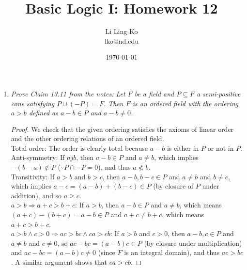 \documentclass{article}
\begin{document}
\title{Basic Logic I: Homework 12}
\author{Li Ling Ko\\ lko@nd.edu}
\date{\today}
\maketitle

\begin{enumerate}[label={\bf Q\arabic*:}]
  \item \it Prove Claim 13.11 from the notes: Let $F$ be a field and
    $P\subseteq F$ a semi-positive cone satisfying $P\cup(-P)=F$. Then $F$
    is an ordered field with the ordering $a>b$ defined as $a-b\in P$ and
    $a-b\neq0$. 

    \begin{proof}
      We check that the given ordering satisfies the axioms of linear
      order and the other ordering relations of an ordered field. \\

      Total order: The order is clearly total because $a-b$ is either in
      $P$ or not in $P$. \\

      Anti-symmetry: If $ajb$, then $a-b\in P$ and $a\neq b$, which implies
      $-(b-a)\notin P$ ($\because P\cap -P=0$), and thus $a\not<b$. \\

      Transitivity: If $a>b$ and $b>c$, then $a-b,b-c\in P$ and $a\neq b$
      and $b\neq c$, which implies $a-c=(a-b)+(b-c)\in P$ (by closure of
      $P$ under addition), and so $a\geq c$. \\

      $a>b\Rightarrow a+c>b+c$: If $a>b$, then $a-b\in P$ and $a\neq b$,
      which means $(a+c)-(b+c)=a-b\in P$ and $a+c\neq b+c$, which means
      $a+c>b+c$. \\

      $a>b\wedge c>0\Rightarrow ac>bc\wedge ca>cb$: If $a>b$ and $c>0$,
      then $a-b,c\in P$ and $a\neq b$ and $c\neq0$, so $ac-bc=(a-b)c\in P$
      (by closure under multiplication) and $ac-bc=(a-b)c\neq0$ (since $F$
      is an integral domain), and thus $ac>bc$. A similar argument shows
      that $ca>cb$.
    \end{proof}
\end{enumerate}
\end{document}
